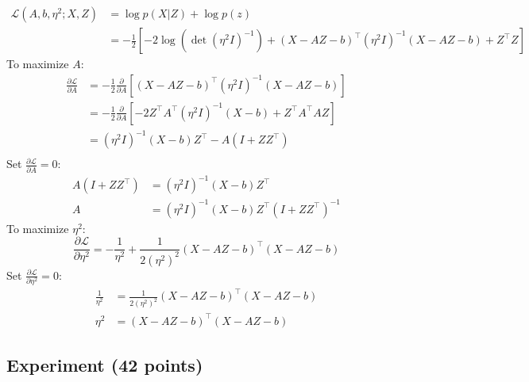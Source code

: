 \begin{enumerate}
\begin{soln}
  $$
  \begin{aligned}
    \mathcal{L}(A, b, \eta^2; X, Z) & = \log p(X \vert Z) + \log p(z) \\
    & = -\frac{1}{2} \left[-2\log(\det(\eta^2 I)^{-1}) + (X-AZ-b)^\top (\eta^2 I)^{-1} (X-AZ-b)+Z^\top Z\right]
  \end{aligned}
  $$
  To maximize $A$:
  $$
  \begin{aligned}
    \frac{\partial \mathcal{L}}{\partial A} & = -\frac{1}{2} \frac{\partial}{\partial A} \left[(X-AZ-b)^\top (\eta^2 I)^{-1} (X-AZ-b)\right] \\
    & = -\frac{1}{2} \frac{\partial}{\partial A} \left[-2 Z^\top A^\top (\eta^2 I)^{-1}(X-b) + Z^\top A^\top AZ \right] \\
    & = (\eta^2 I)^{-1}(X-b)Z^\top - A(I + ZZ^\top) \\
  \end{aligned}
  $$
  Set $\frac{\partial \mathcal{L}}{\partial A} = 0$:
  $$
  \begin{aligned}
    A(I + ZZ^\top) & = (\eta^2 I)^{-1}(X-b)Z^\top \\
    A & = (\eta^2 I)^{-1}(X-b)Z^\top (I + ZZ^\top)^{-1}
  \end{aligned}
  $$
  To maximize $\eta^2$:
  $$\frac{\partial \mathcal{L}}{\partial \eta^2} = -\frac{1}{\eta^2} + \frac{1}{2 (\eta^2)^2}(X-AZ-b)^\top(X-AZ-b)$$
  Set $\frac{\partial \mathcal{L}}{\partial \eta^2} = 0$:
  $$
  \begin{aligned}
    \frac{1}{\eta^2} & = \frac{1}{2 (\eta^2)^2}(X-AZ-b)^\top(X-AZ-b) \\
    \eta^2 & = (X-AZ-b)^\top(X-AZ-b)
  \end{aligned}
  $$
\end{soln}



\end{enumerate}

 
\subsection{Experiment (42 points)}

